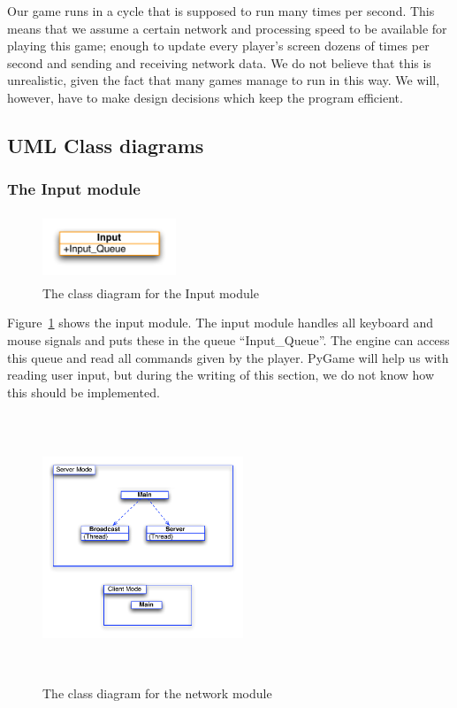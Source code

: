     Our game runs in a cycle that is supposed to run many times per second. This means that we assume a certain network and processing speed to be available for playing this game; enough to update every player's screen dozens of times per second and sending and receiving network data. We do not believe that this is unrealistic, given the fact that many games manage to run in this way. We will, however, have to make design decisions which keep the program efficient.


  \newpage
  \subsection{UML Class diagrams}

    \subsubsection{The Input module} %
    \label{ssub:the_input_module}

      \begin{figure}[!ht]
        \centering
        \includegraphics[width=4cm,height=2cm]{diagrams/UML_input}
        \caption{The class diagram for the Input module}
        \label{fig:UML_input}
      \end{figure}

      Figure~\ref{fig:UML_input} shows the input module. The input module handles all keyboard and mouse signals and puts these in the queue ``Input\_Queue''. The engine can access this queue and read all commands given by the player. PyGame will help us with reading user input, but during the writing of this section, we do not know how this should be implemented.

    \begin{figure}[!ht]
      \centering
      \includegraphics[width=6cm,height=8cm]{diagrams/UML_multicast}
      \caption{The class diagram for the network module} \label{fig:UML_multicast}
    \end{figure}

